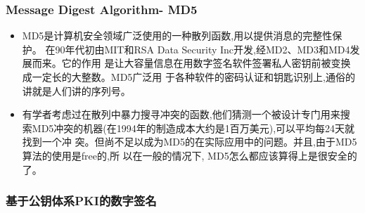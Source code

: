 \begin{frame}[fragile]
  \frametitle{Message Digest Algorithm- MD5}
  \begin{itemize}
  \item MD5是计算机安全领域广泛使用的一种散列函数,用以提供消息的完整性保护。
    在90年代初由MIT和RSA Data Security Inc开发,经MD2、MD3和MD4发展而来。它的作用
    是让大容量信息在用数字签名软件签署私人密钥前被变换成一定长的大整数。MD5广泛用
    于各种软件的密码认证和钥匙识别上,通俗的讲就是人们讲的序列号。
  \item 有学者考虑过在散列中暴力搜寻冲突的函数,他们猜测一个被设计专门用来搜
    索MD5冲突的机器(在1994年的制造成本大约是1百万美元),可以平均每24天就找到一个冲
    突。但尚不足以成为MD5的在实际应用中的问题。并且,由于MD5算法的使用是free的,所
    以在一般的情况下, MD5怎么都应该算得上是很安全的了。
  \end{itemize}
\end{frame}

\begin{frame}[fragile]
  \frametitle{基于公钥体系PKI的数字签名}
  ~
\end{frame}

  